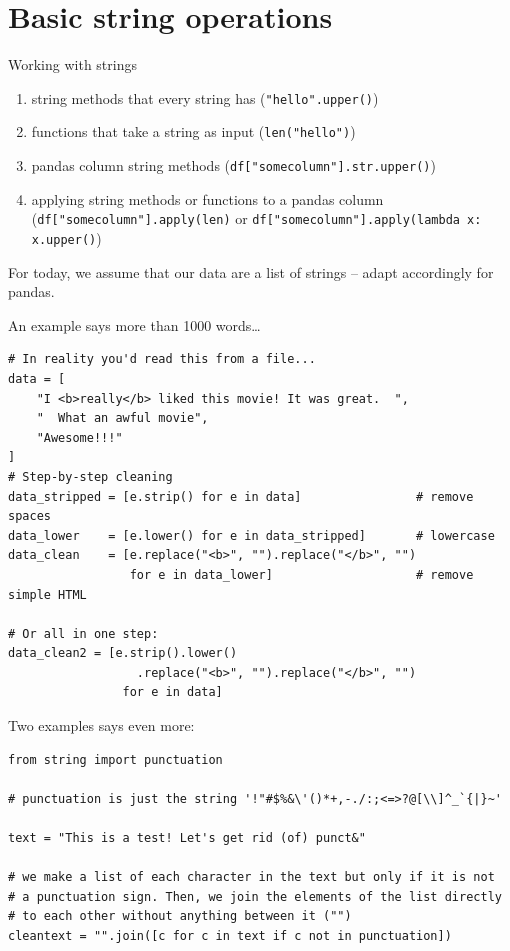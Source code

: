\section{Basic string operations}

\begin{frame}{Working with strings}
\begin{enumerate}[<+->]
\item string methods that every string has (\texttt{"hello".upper()})
\item functions that take a string as input (\texttt{len("hello")})
\item pandas column string methods (\texttt{df["somecolumn"].str.upper()})
\item applying string methods or functions to a pandas column (\texttt{df["somecolumn"].apply(len)} or \texttt{df["somecolumn"].apply(lambda x: x.upper()})
\end{enumerate}

\pause
For today, we assume that our data are a list of strings -- adapt accordingly for pandas.
\end{frame}


\begin{frame}[fragile]{An example says more than 1000 words\ldots}
\begin{verbatim}
# In reality you'd read this from a file...
data = [
    "I <b>really</b> liked this movie! It was great.  ",
    "  What an awful movie",
    "Awesome!!!"
]
# Step-by-step cleaning
data_stripped = [e.strip() for e in data]                # remove spaces
data_lower    = [e.lower() for e in data_stripped]       # lowercase
data_clean    = [e.replace("<b>", "").replace("</b>", "") 
                 for e in data_lower]                    # remove simple HTML

# Or all in one step:
data_clean2 = [e.strip().lower()
                  .replace("<b>", "").replace("</b>", "")
                for e in data]
\end{verbatim}
\end{frame}


\begin{frame}[fragile]{Two examples says even more:}
\begin{verbatim}
from string import punctuation

# punctuation is just the string '!"#$%&\'()*+,-./:;<=>?@[\\]^_`{|}~'

text = "This is a test! Let's get rid (of) punct&"

# we make a list of each character in the text but only if it is not
# a punctuation sign. Then, we join the elements of the list directly
# to each other without anything between it ("")
cleantext = "".join([c for c in text if c not in punctuation])
\end{verbatim}    
\end{frame}


